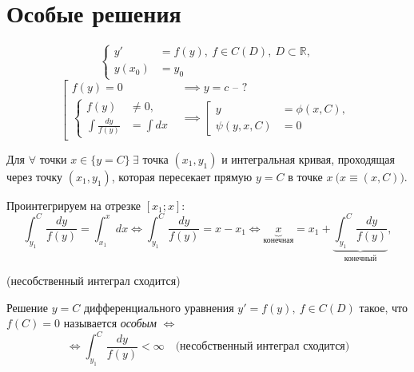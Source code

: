 

\section{Особые решения}

\begin{note}
    \[
        \left\{\begin{array}{rl}
            y'     & = f(y), \ f \in C(D), \ D \subset\mathbb{R}, \\
            y(x_0) & = y_0
        \end{array}\right.
    \]
    \[
        \left[\begin{array}{rl}
            f(y) = 0                           & \implies y = c\text{ -- ?}       \\
            \left\{\begin{array}{rl}
                       f(y)                & \ne 0,    \\
                       \int\frac{dy}{f(y)} & = \int dx
                   \end{array}\right. & \implies \left[\begin{array}{rl}
                                                           y           & = \phi(x,C), \\
                                                           \psi(y,x,C) & = 0
                                                       \end{array}\right.
        \end{array}\right.
    \]

    Для $\forall$ точки $x \in \{y = C\} \ \exists$ точка $(x_1,y_1)$ и интегральная кривая, проходящая через точку $(x_1,y_1)$, которая пересекает прямую $y = C$ в точке $x \ \big(x \equiv (x,C)\big)$.

    Проинтегрируем на отрезке $[x_1;x]$:
    \[
        \int_{y_1}^{C}\frac{dy}{f(y)} = \int_{x_1}^{x}dx \iff \int_{y_1}^{C}\frac{dy}{f(y)} = x-x_1 \iff \underbrace{x}_{\text{конечная}} = x_1 + \underbrace{\int_{y_1}^{C}\frac{dy}{f(y)}}_{\text{конечный}},
    \]
    \begin{center}
        (несобственный интеграл сходится)
    \end{center}
\end{note}

\begin{note}[Критерий]
    Решение $y = C$ дифференциального уравнения $y' = f(y), \ f\in C(D)$ такое, что $f(C) = 0$ называется \emph{особым} $\iff$
    \[
        \iff \int_{y_1}^{C}\frac{dy}{f(y)} < \infty \quad \text{(несобственный интеграл сходится)}
    \]
\end{note}

